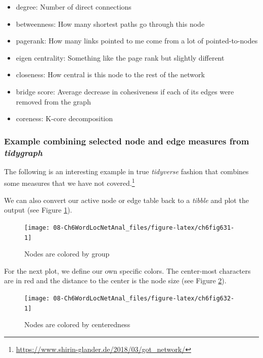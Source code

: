 \documentclass[
]{article}
\providecommand{\tightlist}{%
  \setlength{\itemsep}{0pt}\setlength{\parskip}{0pt}}
\begin{document}
\begin{itemize}
\tightlist
\item
  degree: Number of direct connections
\item
  betweenness: How many shortest paths go through this node
\item
  pagerank: How many links pointed to me come from a lot of pointed-to-nodes
\item
  eigen centrality: Something like the page rank but slightly different
\item
  closeness: How central is this node to the rest of the network
\item
  bridge score: Average decrease in cohesiveness if each of its edges were removed from the graph
\item
  coreness: K-core decomposition
\end{itemize}

\hypertarget{example-combining-selected-node-and-edge-measures-from-tidygraph}{%
\subsubsection{\texorpdfstring{Example combining selected node and edge measures from \emph{tidygraph}}{Example combining selected node and edge measures from tidygraph}}\label{example-combining-selected-node-and-edge-measures-from-tidygraph}}

The following is an interesting example in true \emph{tidyverse} fashion that combines some measures that we have not covered.\footnote{\url{https://www.shirin-glander.de/2018/03/got_network/}}

\footnotesize

\normalsize

We can also convert our active node or edge table back to a \emph{tibble} and plot the output (see Figure \ref{fig:ch6fig631}).

\begin{figure}

{\centering \texttt{[image: 08-Ch6WordLocNetAnal\_files/figure-latex/ch6fig631-1]} 

}

\caption{Nodes are colored by group}\label{fig:ch6fig631}
\end{figure}

For the next plot, we define our own specific colors. The center-most characters are in red and the distance to the center is the node size (see Figure \ref{fig:ch6fig632}).

\begin{figure}

{\centering \texttt{[image: 08-Ch6WordLocNetAnal\_files/figure-latex/ch6fig632-1]} 

}

\caption{Nodes are colored by centeredness}\label{fig:ch6fig632}
\end{figure}
\end{document}
